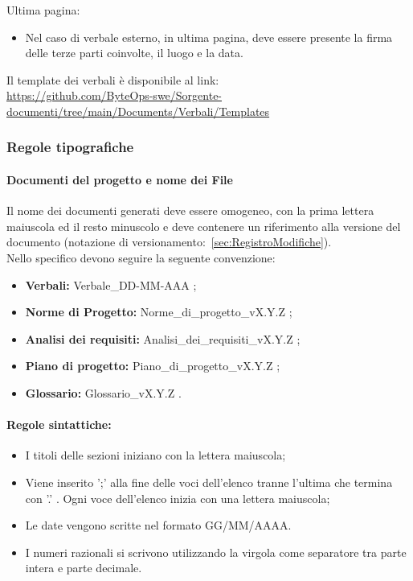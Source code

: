 Ultima pagina:
\begin{itemize}
    \item Nel caso di verbale esterno, in ultima pagina, deve essere presente la firma delle terze parti coinvolte, il luogo e la data.
\end{itemize}

Il template dei verbali è disponibile al link:\\ \href{https://github.com/ByteOps-swe/Sorgente-documenti/tree/main/Documents/Verbali/Templates}{https://github.com/ByteOps-swe/Sorgente-documenti/tree/main/Documents/Verbali/Templates}



\subsubsection{Regole tipografiche}
\paragraph*{Documenti del progetto e nome dei File}\label{sec:NomeFile}
Il nome dei documenti generati deve essere omogeneo, con la prima lettera maiuscola ed il resto minuscolo e deve contenere un riferimento alla versione del documento (notazione di versionamento:~\ref{sec:RegistroModifiche}).\\
Nello specifico devono seguire la seguente convenzione:
\begin{itemize}
    \item \textbf{Verbali:} Verbale\_DD-MM-AAA ;
    \item \textbf{Norme di Progetto:} Norme\_di\_progetto\_vX.Y.Z ;
    \item \textbf{Analisi dei requisiti:} Analisi\_dei\_requisiti\_vX.Y.Z ;
    \item \textbf{Piano di progetto:} Piano\_di\_progetto\_vX.Y.Z ;
    \item \textbf{Glossario:} Glossario\_vX.Y.Z .
\end{itemize}

\paragraph*{Regole sintattiche:}
\begin{itemize}
    \item I titoli delle sezioni iniziano con la lettera maiuscola;
    \item Viene inserito ';' alla fine delle voci dell'elenco tranne l'ultima che termina con '.' . Ogni voce dell'elenco inizia con una lettera maiuscola;
    \item  Le date vengono scritte nel formato GG/MM/AAAA.
    \item  I numeri razionali si scrivono utilizzando la virgola come separatore tra parte intera e parte decimale.
\end{itemize}
